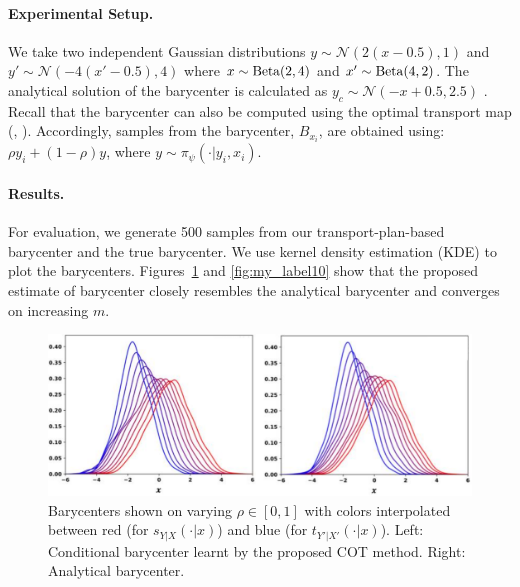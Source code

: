 \paragraph{Experimental Setup.} We take two independent Gaussian distributions $y \sim \mathcal{N}(2(x-0.5),1)$ and $y' \sim \mathcal{N}(-4(x'-0.5),4)$ where  $x \sim \rm{Beta}(2,4)$ and $x' \sim \rm{Beta}(4,2)$.  The analytical solution of the barycenter is calculated as $y_c \sim \mathcal{N}(-x+0.5,2.5)$ \citep{peyre2019computational}.
Recall that the barycenter can also be computed using the optimal transport map (\cite[Remark (3.1)]{pmlr-v97-gordaliza19a}, \citep{interpolationMT}). 
Accordingly, samples from the barycenter, $B_{x_i}$, are obtained using: $\rho y_i+ (1-\rho)y$, where $y \sim \pi_\psi(\cdot|y_i, x_i)$.
\paragraph{Results.} For evaluation, we generate 500 samples from our transport-plan-based barycenter and the true barycenter. We use kernel density estimation (KDE) to plot the barycenters. Figures~\ref{fig:my_label11} and \ref{fig:my_label10} show that the proposed estimate of barycenter closely resembles the analytical barycenter and converges on increasing $m$.
\begin{figure}[t]
    \centering
    \includegraphics[width=0.6\columnwidth]{chapter-3/images/bary-final-plot.pdf}
    \caption[Qualitative comparison of the barycenters obtained with the proposed COT formulation and the true barycenters.]{Barycenters shown on varying $\rho\in[0, 1]$ with colors interpolated between red (for $s_{Y|X}(\cdot|x)$) and blue (for $t_{Y'|X'}(\cdot|x)$). Left: Conditional barycenter learnt by the proposed COT method. Right: Analytical barycenter.}
    \label{fig:my_label11}
\end{figure}

